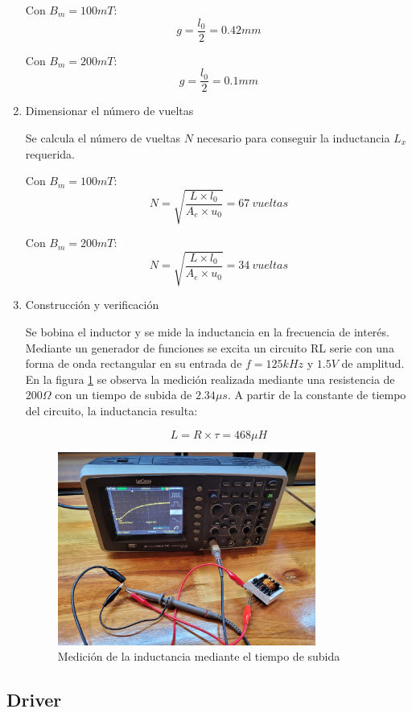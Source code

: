 \begin{enumerate}
Con $B_m=100mT$:
$$ g=\frac{l_0}{2}=0.42mm $$

Con $B_m=200mT$:
$$ g=\frac{l_0}{2}=0.1mm $$

\item{Dimensionar el número de vueltas}

Se calcula el número de vueltas $N$ necesario para conseguir la inductancia $L_x$ requerida.

Con $B_m=100mT$:
$$ N=\sqrt{\frac{L\times l_0}{A_e\times u_0}}=67\ vueltas$$

Con $B_m=200mT$:
$$ N=\sqrt{\frac{L\times l_0}{A_e\times u_0}}=34\ vueltas $$

\item{Construcción y verificación}

Se bobina el inductor y se mide la inductancia en la frecuencia de interés. Mediante un generador de funciones se excita un circuito RL serie con una forma de onda rectangular en su entrada de $f=125kHz$ y $1.5V$ de amplitud.  
En la figura \ref{fig:osc-inductor-ts} se observa la medición realizada mediante una resistencia de $200\Omega$ con un tiempo de subida de $2.34\mu s$. 
A partir de la constante de tiempo del circuito, la inductancia resulta:

$$ L=R\times\tau=468\mu H $$ 

\begin{figure}[ht]
    \centering
    \includegraphics[width=0.8\textwidth]{images/osc-inductor-ts.jpeg}
    \caption{Medición de la inductancia mediante el tiempo de subida}
    \label{fig:osc-inductor-ts}
\end{figure}

\end{enumerate}

\subsection{Driver}

